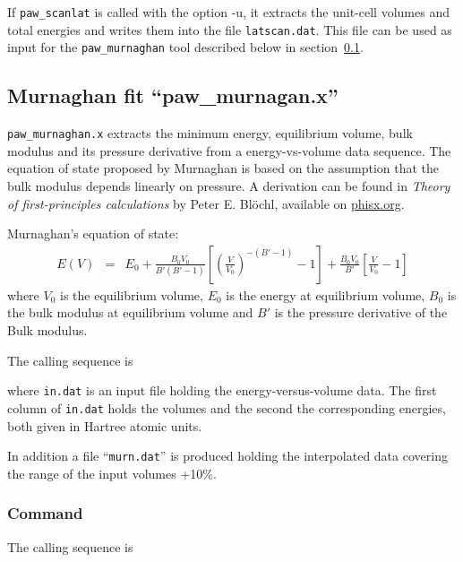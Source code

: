 \documentclass[final,12pt,makeidx,DIV=calc]{article}
\begin{document}
{{{{{{If \verb|paw_scanlat| is called with the option -u, it extracts the
unit-cell volumes and total energies and writes them into the file
\verb|latscan.dat|.  This file can be used as input for the
\verb|paw_murnaghan| tool described below in
section~\ref{sec:pawmurnaghantool}.

\subsection{Murnaghan fit ``paw\_murnagan.x''}
\label{sec:pawmurnaghantool}
{\tt paw\_murnaghan.x} extracts the minimum energy, equilibrium
volume, bulk modulus and its pressure derivative from a
energy-vs-volume data sequence. The equation of state proposed by
Murnaghan\cite{murnaghan44_pnas30_244} is based on the assumption that
the bulk modulus depends linearly on pressure. A derivation can be
found in \textit{Theory of first-principles calculations} by Peter
E. Bl\"ochl, available on \url{phisx.org}.

Murnaghan's equation of state:
\begin{eqnarray}
E(V)&=&E_0+
\frac{B_0V_0}{B'(B'-1)}\left[\left(\frac{V}{V_0}\right)^{-(B'-1)}-1\right]
+\frac{B_0V_0}{B'}\left[\frac{V}{V_0}-1\right]
\end{eqnarray}
where $V_0$ is the equilibrium volume, $E_0$ is the energy at
equilibrium volume, $B_0$ is the bulk modulus at equilibrium volume
and $B'$ is the pressure derivative of the Bulk modulus.

The calling sequence is

\bigskip{}\bigskip

where {\tt in.dat} is an input file holding the energy-versus-volume
data.  The first column of {\tt in.dat} holds the volumes and the
second the corresponding energies, both given in Hartree atomic
units. 

In addition a file ``{\tt murn.dat}'' is produced holding the
interpolated data covering the range of the input volumes +10\%.

\subsubsection{Command}
The calling sequence is

}}}}}}
\end{document}
